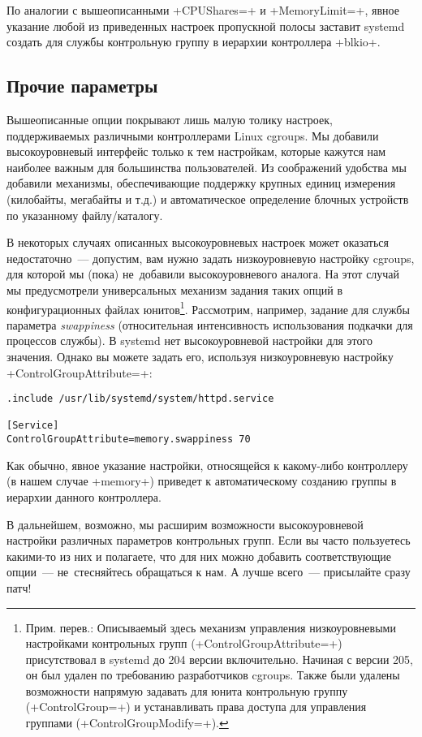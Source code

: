 \documentclass[10pt,oneside,a4paper]{article}
\begin{document}
По аналогии с вышеописанными +CPUShares=+ и +MemoryLimit=+, явное указание любой
из приведенных настроек пропускной полосы заставит systemd создать для службы
контрольную группу в иерархии контроллера +blkio+.

\subsection{Прочие параметры}

Вышеописанные опции покрывают лишь малую толику настроек, поддерживаемых
различными контроллерами Linux cgroups. Мы добавили высокоуровневый интерфейс
только к тем настройкам, которые кажутся нам наиболее важным для большинства
пользователей. Из соображений удобства мы добавили механизмы, обеспечивающие
поддержку крупных единиц измерения (килобайты, мегабайты и т.д.) и
автоматическое определение блочных устройств по указанному файлу/каталогу.

В некоторых случаях описанных высокоуровневых настроек может оказаться
недостаточно~--- допустим, вам нужно задать низкоуровневую настройку cgroups,
для которой мы (пока) не~добавили высокоуровневого аналога. На этот случай мы
предусмотрели универсальных механизм задания таких опций в конфигурационных 
файлах юнитов\footnote{Прим. перев.: Описываемый здесь механизм управления
низкоуровневыми настройками контрольных групп (+ControlGroupAttribute=+)
присутствовал в systemd до 204 версии включительно. Начиная с версии 205, он был
удален по требованию разработчиков cgroups. Также были удалены возможности
напрямую задавать для юнита контрольную группу (+ControlGroup=+) и устанавливать
права доступа для управления группами (+ControlGroupModify=+).}. Рассмотрим,
например, задание для службы параметра \emph{swappiness} (относительная
интенсивность использования подкачки для процессов службы). В systemd нет
высокоуровневой настройки для этого значения.  Однако вы можете задать его,
используя низкоуровневую настройку +ControlGroupAttribute=+:
\begin{Verbatim}
.include /usr/lib/systemd/system/httpd.service

[Service]
ControlGroupAttribute=memory.swappiness 70
\end{Verbatim}
Как обычно, явное указание настройки, относящейся к какому-либо контроллеру (в
нашем случае +memory+) приведет к автоматическому созданию группы в иерархии
данного контроллера.

В дальнейшем, возможно, мы расширим возможности высокоуровневой настройки 
различных параметров контрольных групп. Если вы часто пользуетесь какими-то из
них и полагаете, что для них можно добавить соответствующие опции~---
не~стесняйтесь обращаться к нам. А лучше всего~--- присылайте сразу патч!
\end{document}
